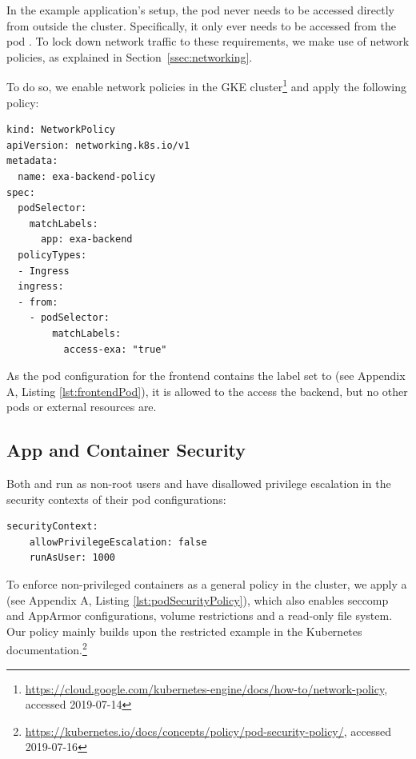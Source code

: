In the example application's setup, the pod  never needs to be accessed directly from outside the cluster. Specifically, it only ever needs to be accessed from the pod . To lock down network traffic to these requirements, we make use of network policies, as explained in Section~\ref{ssec:networking}. 

To do so, we enable network policies in the \ac{GKE} cluster\footnote{\url{https://cloud.google.com/kubernetes-engine/docs/how-to/network-policy}, accessed 2019-07-14} and apply the following policy:

\begin{verbatim}
kind: NetworkPolicy
apiVersion: networking.k8s.io/v1
metadata:
  name: exa-backend-policy
spec:
  podSelector:
    matchLabels:
      app: exa-backend
  policyTypes:
  - Ingress
  ingress:
  - from:
    - podSelector:
        matchLabels:
          access-exa: "true"
\end{verbatim}

As the pod configuration for the frontend contains the label  set to  (see Appendix A, Listing \ref{lst:frontendPod}), it is allowed to the access the backend, but no other pods or external resources are.

\subsection{App and Container Security} \label{ssec:exaLayer4}

Both  and  run as non-root users and have disallowed privilege escalation in the security contexts of their pod configurations:

\begin{verbatim}
securityContext:
    allowPrivilegeEscalation: false
    runAsUser: 1000
\end{verbatim}

To enforce non-privileged containers as a general policy in the cluster, we apply a  (see Appendix A, Listing \ref{lst:podSecurityPolicy}), which also enables seccomp and AppArmor configurations, volume restrictions and a read-only file system. Our policy mainly builds upon the restricted example in the Kubernetes documentation.\footnote{\url{https://kubernetes.io/docs/concepts/policy/pod-security-policy/}, accessed 2019-07-16} 

